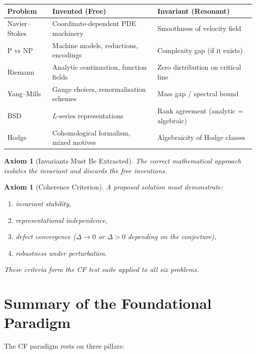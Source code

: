 \documentclass[12pt, openany]{book}
\newtheorem{axiom}[theorem]{Axiom}
\theoremstyle{remark}
\begin{document}
\begin{center}
\begin{tabular}{@{}lll@{}}
\toprule
\textbf{Problem} & \textbf{Invented (Free)} & \textbf{Invariant (Resonant)} \\
\midrule
Navier--Stokes & Coordinate-dependent PDE machinery & Smoothness of velocity field \\
P vs NP        & Machine models, reductions, encodings & Complexity gap (if it exists) \\
Riemann        & Analytic continuation, function fields & Zero distribution on critical line \\
Yang--Mills    & Gauge choices, renormalisation schemes & Mass gap / spectral bound \\
BSD            & $L$-series representations & Rank agreement (analytic = algebraic) \\
Hodge          & Cohomological formalism, mixed motives & Algebraicity of Hodge classes \\
\bottomrule
\end{tabular}
\end{center}

\begin{axiom}[Invariants Must Be Extracted]\label{ax:extract}
The correct mathematical approach isolates the invariant and discards the free inventions.
\end{axiom}

\begin{axiom}[Coherence Criterion]\label{ax:coherence-crit}
A proposed solution must demonstrate:
\begin{enumerate}
  \item invariant stability,
  \item representational independence,
  \item defect convergence ($\Delta \to 0$ or $\Delta > 0$ depending on the conjecture),
  \item robustness under perturbation.
\end{enumerate}
These criteria form the CF test suite applied to all six problems.
\end{axiom}

\section{Summary of the Foundational Paradigm}
\label{sec:found-summary}

The CF paradigm rests on three pillars:
\end{document}
